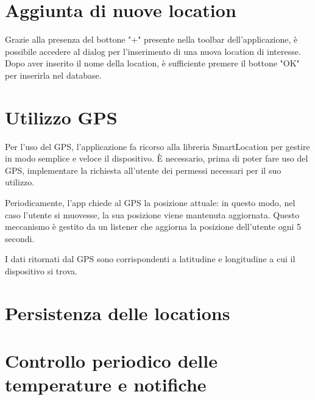 \documentclass[twoside]{supsistudent}
\begin{document}
\section{Aggiunta di nuove location}
Grazie alla presenza del bottone "+" presente nella toolbar dell'applicazione, è possibile accedere al dialog per l'inserimento di una nuova location di interesse. Dopo aver inserito il nome della location, è sufficiente premere il bottone "OK" per inserirla nel database.

\section{Utilizzo GPS}
Per l'uso del GPS, l'applicazione fa ricorso alla libreria SmartLocation per gestire in modo semplice e veloce il dispositivo. \`E necessario, prima di poter fare uso del GPS, implementare la richiesta all'utente dei permessi necessari per il suo utilizzo.

Periodicamente, l'app chiede al GPS la posizione attuale: in questo modo, nel caso l'utente si muovesse, la sua posizione viene mantenuta aggiornata. Questo meccanismo è gestito da un listener che aggiorna la posizione dell'utente ogni 5 secondi.

I dati ritornati dal GPS sono corrispondenti a latitudine e longitudine a cui il dispositivo si trova.

\section{Persistenza delle locations}
\lipsum[13]

\section{Controllo periodico delle temperature e notifiche}
\lipsum[13]
\end{document}
